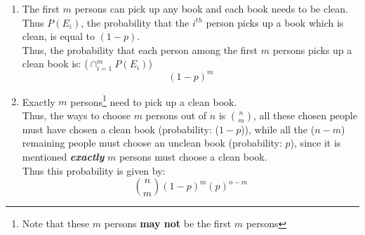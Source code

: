 \documentclass[11pt]{article}
\begin{document}
\begin{enumerate}[label=(\alph*)]
    \item The first $m$ persons can pick up any book and each book needs to be clean. Thus $P(E_i)$, the probability that the $i^{th}$ person picks up a book which is clean, is equal to $(1-p)$.\\
          Thus, the probability that each person among the first $m$ persons picks up a clean book is: ($ \cap_{i=1}^{m} P(E_i) $)
          $$ (1-p)^m $$

    \item Exactly $m$ persons\footnote{Note that these $m$ persons \textbf{may not} be the first $m$ persons} need to pick up a clean book.\\
          Thus, the ways to choose $m$ persons out of $n$ is ${n\choose m}$, all these chosen people must have chosen a clean book (probability: ($1-p$)), while all the ($ n-m $) remaining people must choose an unclean book (probability: $p$), since it is mentioned \textbf{\textit{exactly}} $m$ persons must choose a clean book.\\
          Thus this probability is given by:
          $$ {n\choose m} (1-p)^m (p)^{n-m} $$

\end{enumerate}



\newpage
\end{document}
